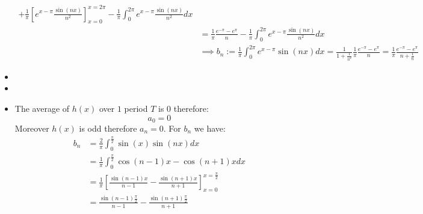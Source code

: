 \documentclass[11pt]{article}
\begin{document}
\begin{solution}
\begin{itemize}
\begin{align*}
            +
            \frac{1}{\pi}
            \left[ e^{x-\pi} \frac{ \sin(n x) }{ n^2 } \right]_{x=0}^{x=2\pi}
            -
            \frac{1}{\pi}
            \int_{0}^{2\pi} e^{x-\pi}\frac{ \sin(n x) }{n^2 } dx
            \\&
            =
            \frac{1}{\pi}\frac{e^{-\pi} - e^{\pi}}{n}
            -
            \frac{1}{\pi}
            \int_{0}^{2\pi} e^{x-\pi}\frac{ \sin(n x) }{n^2 } dx
	\\&
	\implies
	b_n:= \frac{1}{\pi}
            \int_{0}^{2\pi} e^{x - \pi} \sin(n x) dx = \frac{1}{1 + \frac{1}{n^2}} \frac{1}{\pi}\frac{e^{-\pi} - e^{\pi}}{n} = \frac{1}{\pi}  \frac{e^{-\pi} - e^{\pi}}{n + \frac{1}{n}}
        \end{align*}
\item
\item
\item The average of $h(x)$ over $1$ period $T$ is $0$ therefore:
        \[
            a_0 = 0
        \]
        Moreover $h(x)$ is odd therefore $a_n = 0$. For $b_n$ we have:
        \begin{align*}
            b_n 
            &
            = 
            \frac{2}{\pi}
            \int_{0}^{\frac{\pi}{2}} \sin(x) \sin(n x) dx
            \\&
            =
             \frac{1}{\pi}
            \int_{0}^{\frac{\pi}{2}} \cos(n-1)x - \cos(n+1)x dx
            \\&
            =
            \frac{1}{\pi}
             \left[ \frac{\sin(n-1)x}{n-1} - \frac{\sin(n+1)x}{n+1}\right]_{x=0}^{x=\frac{\pi}{2}}
            \\&
            =
	\frac{\sin(n-1)\frac{\pi}{2}}{n-1} - \frac{\sin(n+1)\frac{\pi}{2}}{n+1}
        \end{align*}
\end{itemize}
\end{solution}
\end{document}

